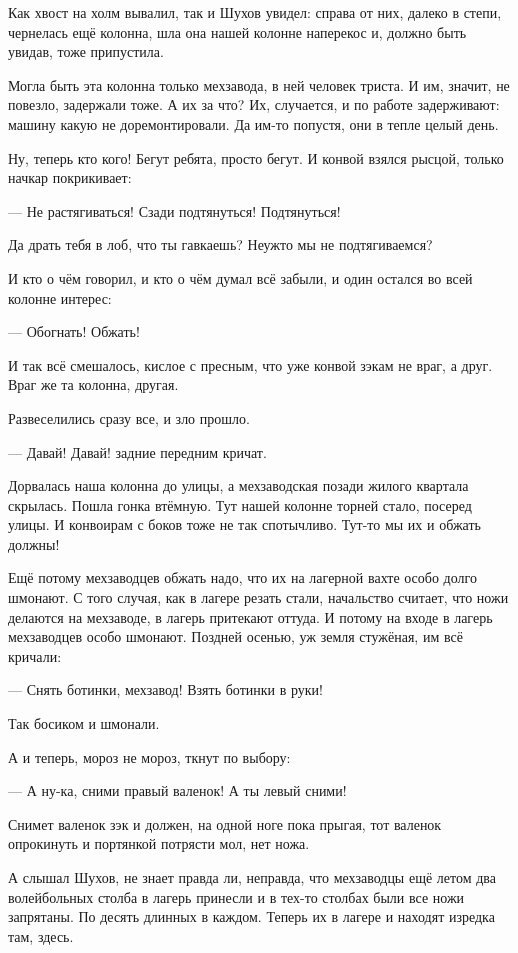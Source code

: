 Как хвост на холм вывалил, так и Шухов увидел: справа от них, далеко в степи, чернелась ещё
колонна, шла она нашей колонне наперекос и, должно быть увидав, тоже припустила.

Могла быть эта колонна только мехзавода, в ней человек триста. И им, значит, не повезло,
задержали тоже. А их за что? Их, случается, и по работе задерживают: машину какую не
доремонтировали. Да им-то попустя, они в тепле целый день.

Ну, теперь кто кого! Бегут ребята, просто бегут. И конвой взялся рысцой, только начкар
покрикивает:

--- Не растягиваться! Сзади подтянуться! Подтянуться!

Да драть тебя в лоб, что ты гавкаешь? Неужто мы не подтягиваемся?

И кто о чём говорил, и кто о чём думал \dash всё забыли, и один остался во всей колонне интерес:

--- Обогнать! Обжать!

И так всё смешалось, кислое с пресным, что уже конвой зэкам не враг, а друг. Враг же \dash та
колонна, другая.

Развеселились сразу все, и зло прошло.

--- Давай! Давай! \dash задние передним кричат.

Дорвалась наша колонна до улицы, а мехзаводская позади жилого квартала скрылась. Пошла
гонка втёмную. Тут нашей колонне торней стало, посеред улицы. И конвоирам с боков тоже не так
спотычливо. Тут-то мы их и обжать должны!

Ещё потому мехзаводцев обжать надо, что их на лагерной вахте особо долго шмонают. С того
случая, как в лагере резать стали, начальство считает, что ножи делаются на мехзаводе, в
лагерь притекают оттуда. И потому на входе в лагерь мехзаводцев особо шмонают. Поздней
осенью, уж земля стужёная, им всё кричали:

--- Снять ботинки, мехзавод! Взять ботинки в руки!

Так босиком и шмонали.

А и теперь, мороз не мороз, ткнут по выбору:

--- А ну-ка, сними правый валенок! А ты \dash левый сними!

Снимет валенок зэк и должен, на одной ноге пока прыгая, тот валенок опрокинуть и портянкой
потрясти \dash мол, нет ножа.

А слышал Шухов, не знает \dash правда ли, неправда, \dash что мехзаводцы ещё летом два волейбольных
столба в лагерь принесли и в тех-то столбах были все ножи запрятаны. По десять длинных в
каждом. Теперь их в лагере и находят изредка \dash там, здесь.

